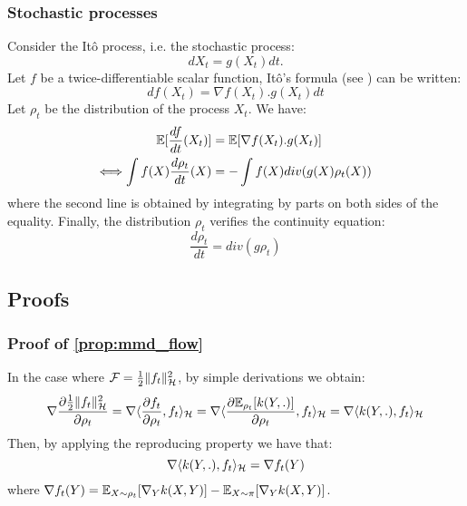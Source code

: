 \subsubsection{Stochastic processes}

Consider the Itô process, i.e. the stochastic process:
\begin{equation}
dX_t=g(X_t)dt.
\end{equation}
Let $f$ be a twice-differentiable scalar function, Itô's formula (see \cite{ito1951stochastic}) can be written:
\begin{equation}
df(X_t)=\nabla f(X_t).g(X_t)dt
\end{equation}
Let $\rho_t$ be the distribution of the process $X_t$. We have:
\begin{align}
{{\mathbb E}}[\frac{df}{dt}(X_t)]&= {{\mathbb E}}[\nabla f(X_t).g(X_t)]\\
\Longleftrightarrow \int f(X) \frac{d \rho_t}{dt}(X)&=-\int f(X)div(g(X)\rho_t(X))
\end{align}
where the second line is obtained by integrating by parts on both sides of the equality. Finally, the distribution $\rho_t$ verifies the continuity equation: 
\begin{equation}
\frac{d\rho_t}{dt}=div(g\rho_t)
\end{equation}


\subsection{Proofs}

\subsubsection{Proof of \cref{prop:mmd_flow}}

In the case where ${{\mathcal F}}= \frac{1}{2} \|f_t\|^2_{{{\mathcal H}}}$, by simple derivations we obtain:
\begin{equation}
 \nabla \frac{\partial\frac{1}{2} \|f_t\|^2_{{{\mathcal H}}}}{\partial \rho_t}= \nabla \langle \frac{\partial f_t}{\partial \rho_t}, f_t \rangle_{{{\mathcal H}}}= \nabla \langle \frac{\partial {{\mathbb E}}_{\rho_t}[k(Y,.)]}{\partial \rho_t}, f_t \rangle_{{{\mathcal H}}}= \nabla \langle k(Y,.), f_t \rangle_{{{\mathcal H}}}
\end{equation}
Then, by applying the reproducing property we have that:
\begin{equation}
\nabla \langle k(Y,.), f_t \rangle_{{{\mathcal H}}}
= \nabla f_t(Y)
\end{equation}
where $\nabla f_t(Y)= {{\mathbb E}}_{X \sim \rho_t}[\nabla_{Y}k(X,Y)] -  {{\mathbb E}}_{X \sim \pi}[\nabla_{Y}k(X,Y)]$.

